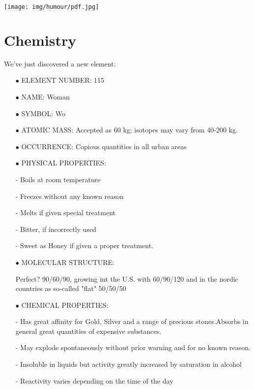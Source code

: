 	\begin{center}
	\texttt{[image: img/humour/pdf.jpg]}
	\end{center}
		
	\pagebreak
	\section{Chemistry}

We've just discovered a new element:

\begin{itemize}
	\item[$\bullet$] ELEMENT NUMBER: 115

	\item[$\bullet$]NAME: Woman

	\item[$\bullet$] SYMBOL: Wo

	\item[$\bullet$] ATOMIC MASS: Accepted as 60 kg; isotopes may vary from 40-200 kg.

	\item[$\bullet$] OCCURRENCE: Copious quantities in all urban areas

	\item[$\bullet$] PHYSICAL PROPERTIES:

- Boils at room temperature

- Freezes without any known reason

- Melts if given special treatment

- Bitter, if incorrectly used

- Sweet as Honey if given a proper treatment.

	\item[$\bullet$] MOLECULAR STRUCTURE:

Perfect? 90/60/90, growing int the U.S. with 60/90/120 and in the nordic countries as so-called "flat" 50/50/50

	\item[$\bullet$] CHEMICAL PROPERTIES:

- Has great affinity for Gold, Silver and a range of precious stones.Absorbs in general great quantities of expensive substances.

- May explode spontaneously without prior warning and for no known reason.

- Insoluble in liquids but activity greatly increased by saturation in alcohol

- Reactivity varies depending on the time of the day


\end{itemize}
